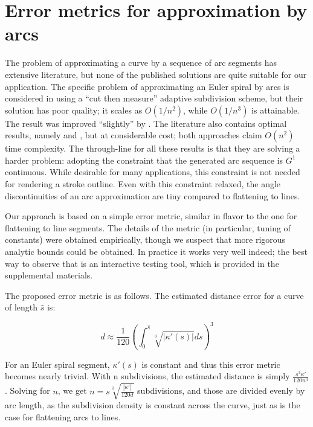 \documentclass[sigconf]{acmart}
\begin{document}
\section{Error metrics for approximation by arcs}

The problem of approximating a curve by a sequence of arc segments has extensive literature, but none of the published solutions are quite suitable for our application. The specific problem of approximating an Euler spiral by arcs is considered in \citet{Meek2004} using a ``cut then measure'' adaptive subdivision scheme, but their solution has poor quality; it scales as $O(1/n^2)$, while $O(1/n^3)$ is attainable. The result was improved ``slightly'' by \citet{Narayan2014}. The literature also contains optimal results, namely \citet{Maier2014} and \citet{Nuntawisuttiwong2021}, but at considerable cost; both approaches claim $O(n^2)$ time complexity. The through-line for all these results is that they are solving a harder problem: adopting the constraint that the generated arc sequence is $G^1$ continuous. While desirable for many applications, this constraint is not needed for rendering a stroke outline. Even with this constraint relaxed, the angle discontinuities of an arc approximation are tiny compared to flattening to lines.


Our approach is based on a simple error metric, similar in flavor to the one for flattening to line segments. The details of the metric (in particular, tuning of constants) were obtained empirically, though we suspect that more rigorous analytic bounds could be obtained. In practice it works very well indeed; the best way to observe that is an interactive testing tool, which is provided in the supplemental materials.

The proposed error metric is as follows. The estimated distance error for a curve of length $\hat{s}$ is:

\[
    d \approx \frac{1}{120}\left(\int_0^{\hat{s}} \sqrt[3]{|\kappa'(s)|}ds \right)^3
\]

For an Euler spiral segment, $\kappa'(s)$ is constant and thus this error metric becomes nearly trivial. With n subdivisions, the estimated distance is simply $\frac{s^3\kappa'}{120n^3}$. Solving for $n$, we get $n = s\sqrt[3]{\frac{|\kappa'|}{120d}}$ subdivisions, and those are divided evenly by arc length, as the subdivision density is constant across the curve, just as is the case for flattening arcs to lines.
\end{document}
